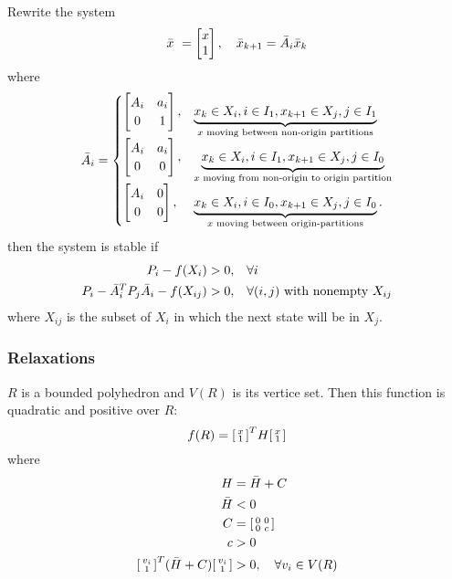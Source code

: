 Rewrite the system
\begin{equation}
  \bar{x} = \bmat{x \\ 1}, \quad \bar{x}_{k+1} = \bar{A}_i \bar{x}_k
\end{equation}
%
where
%
\begin{equation}
  \bar{A}_i =
  \begin{cases}
    \begin{bmatrix} A_i & a_i \\ 0 & 1 \end{bmatrix},&
    \underbrace{x_k \in X_i, i \in I_1, x_{k+1} \in X_j, j \in I_1}
              _{x \text{ moving between non-origin partitions}} \\
    \begin{bmatrix} A_i & a_i \\ 0 & 0 \end{bmatrix},&
    \underbrace{x_k \in X_i, i \in I_1, x_{k+1} \in X_j, j \in I_0}
              _{x \text{ moving from non-origin to origin partition}} \\
    \begin{bmatrix} A_i & 0 \\ 0 & 0 \end{bmatrix},&
    \underbrace{x_k \in X_i, i \in I_0, x_{k+1} \in X_j, j \in I_0}
              _{x \text{ moving between origin-partitions}}.
  \end{cases}
\end{equation}
%
then the system is stable if
%
\begin{equation}
  \begin{split}
    P_i - f(X_i) > 0,\quad & \forall i \\
    P_i - \bar{A}_i^{T} P_j \bar{A}_i - f(X_{ij}) > 0,\quad & \forall (i,j) \mbox{ with nonempty } X_{ij}
  \end{split}
\end{equation}
%
where $X_{ij}$ is the subset of $X_i$ in which the next state will be in $X_j$.

\subsubsection{Relaxations}
$R$ is a bounded polyhedron and $V(R)$ is its vertice set. Then this function is quadratic and positive over $R$:
\begin{equation}
  f(R) = \begin{bsmallmatrix} x \\ 1 \end{bsmallmatrix}^{T} H \begin{bsmallmatrix} x \\ 1 \end{bsmallmatrix}
\end{equation}
%
where
%
\begin{equation}
  \begin{split}
    H &= \bar{H} + C \\
    \bar{H} &< 0 \\
    C &= \begin{bsmallmatrix} 0 & 0 \\ 0 & c \end{bsmallmatrix} \\
    c &> 0 \\
    \begin{bsmallmatrix} v_i \\ 1 \end{bsmallmatrix}^{T} (\bar{H} + C) \begin{bsmallmatrix} v_i \\ 1 \end{bsmallmatrix} &> 0,\quad \forall v_i \in V(R)
  \end{split}
\end{equation}
